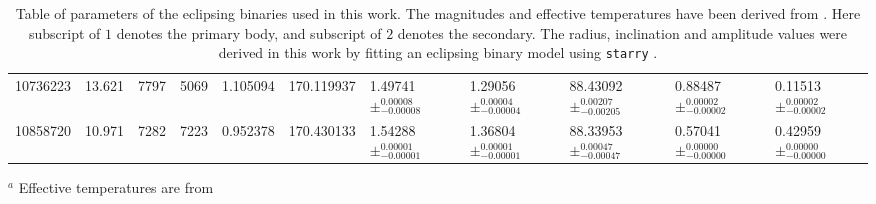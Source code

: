\begin{sidewaystable*}
\begin{tabular}{rrrrrrlllll}
  10736223 &            13.621 &             7797 &             5069 &  1.105094 &  170.119937 &  1.49741$\pm_{-0.00008}^{0.00008}$ &  1.29056$\pm_{-0.00004}^{0.00004}$ &  88.43092$\pm_{-0.00205}^{0.00207}$ &  0.88487$\pm_{-0.00002}^{0.00002}$ &  0.11513$\pm_{-0.00002}^{0.00002}$ \\
  10858720 &            10.971 &             7282 &             7223 &  0.952378 &  170.430133 &  1.54288$\pm_{-0.00001}^{0.00001}$ &  1.36804$\pm_{-0.00001}^{0.00001}$ &  88.33953$\pm_{-0.00047}^{0.00047}$ &  0.57041$\pm_{-0.00000}^{0.00000}$ &  0.42959$\pm_{-0.00000}^{0.00000}$ \\
\bottomrule
\end{tabular}
\label{tab:parameters}
\caption{Table of parameters of the eclipsing binaries used in this work. The \kepler magnitudes and effective temperatures have been derived from \cite{ebliterature}. Here subscript of $1$ denotes the primary body, and subscript of $2$ denotes the secondary. The radius, inclination and amplitude values were derived in this work by fitting an eclipsing binary model using \texttt{starry} \citep{starry}.}
\footnotesize{$^a$ Effective temperatures are from \cite{ebliterature}}
\end{sidewaystable*}
